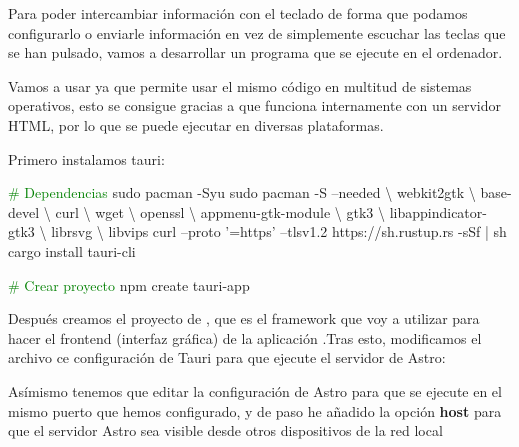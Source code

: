 Para poder intercambiar información con el teclado de forma que podamos configurarlo o enviarle información en vez de simplemente escuchar las teclas que se han pulsado, vamos a desarrollar un programa que se ejecute en el ordenador. 

Vamos a usar  ya que permite usar el mismo código en multitud de sistemas operativos, esto se consigue gracias a que funciona internamente con un servidor HTML, por lo que se puede ejecutar en diversas plataformas.

Primero instalamos tauri:
\begin{multicli}
    \textcolor{green}{\# Dependencias} \newline
    \cliarrow sudo pacman -Syu \newline
    \cliarrow sudo pacman -S --needed \textbackslash \newline
    \mytab webkit2gtk \textbackslash \newline
    \mytab base-devel \textbackslash \newline
    \mytab curl \textbackslash \newline
    \mytab wget \textbackslash \newline
    \mytab openssl \textbackslash \newline
    \mytab appmenu-gtk-module  \textbackslash \newline
    \mytab gtk3 \textbackslash \newline
    \mytab libappindicator-gtk3 \textbackslash \newline
    \mytab librsvg \textbackslash \newline
    \mytab libvips \newline
    \cliarrow curl --proto '=https' --tlsv1.2 https://sh.rustup.rs -sSf | sh \newline
    \cliarrow cargo install tauri-cli \newline

    \textcolor{green}{\# Crear proyecto} \newline
    \cliarrow npm create tauri-app
\end{multicli}

Después creamos el proyecto de , que es el framework que voy a utilizar para hacer el frontend (interfaz gráfica) de la aplicación .Tras esto, modificamos el archivo ce configuración de Tauri para que ejecute el servidor de Astro:

\newpage
Asímismo tenemos que editar la configuración de Astro para que se ejecute en el mismo puerto que hemos configurado, y de paso he añadido la opción \textbf{host} para que el servidor Astro sea visible desde otros dispositivos de la red local

